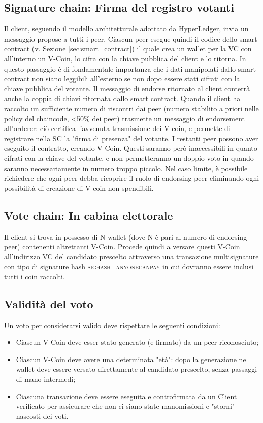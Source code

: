 	\subsection{Signature chain: Firma del registro votanti}
		Il client, seguendo il modello architetturale adottato da HyperLedger, invia un messaggio propose a tutti i peer. Ciascun peer esegue quindi il codice dello smart contract (\hyperref[sec:smart_contract]{v. Sezione \ref*{sec:smart_contract}}) il quale crea un wallet per la VC con all'interno un V-Coin, lo cifra con la chiave pubblica del client e lo ritorna. In questo passaggio è di fondamentale importanza che i dati manipolati dallo smart contract non siano leggibili all'esterno se non dopo essere stati cifrati con la chiave pubblica del votante. Il messaggio di endorse ritornato al client conterrà anche la coppia di chiavi ritornata dallo smart contract. Quando il client ha raccolto un sufficiente numero di riscontri dai peer (numero stabilito a priori nelle policy del chaincode, \textless 50\% dei peer) trasmette un messaggio di endorsement all'orderer: ciò certifica l'avvenuta trasmissione dei V-coin, e permette di registrare nella SC la "firma di presenza" del votante. I restanti peer possono aver eseguito il contratto, creando V-Coin. Questi saranno però inaccessibili in quanto cifrati con la chiave del votante, e non permetteranno un doppio voto in quando saranno necessariamente in numero troppo piccolo. Nel caso limite, è possibile richiedere che ogni peer debba ricoprire il ruolo di endorsing peer eliminando ogni possibilità di creazione di V-coin non spendibili.

	\subsection{Vote chain: In cabina elettorale}
		Il client si trova in possesso di N wallet (dove N è pari al numero di endorsing peer) contenenti altrettanti V-Coin. Procede quindi a versare questi V-Coin all'indirizzo VC del candidato prescelto attraverso una transazione multisignature con tipo di signature hash \textsc{sighash\_anyonecanpay} in cui dovranno essere inclusi tutti i coin raccolti.

	\subsection{Validità del voto}
		Un voto per considerarsi valido deve rispettare le seguenti condizioni:
		\begin{itemize}
			\item Ciascun V-Coin deve esser stato generato (e firmato) da un peer riconosciuto;
			\item Ciascun V-Coin deve avere una determinata "età": dopo la generazione nel wallet deve essere versato direttamente al candidato prescelto, senza passaggi di mano intermedi;
			\item Ciascuna transazione deve essere eseguita e controfirmata da un Client verificato per assicurare che non ci siano state manomissioni e "storni" nascosti dei voti.
		\end{itemize}

